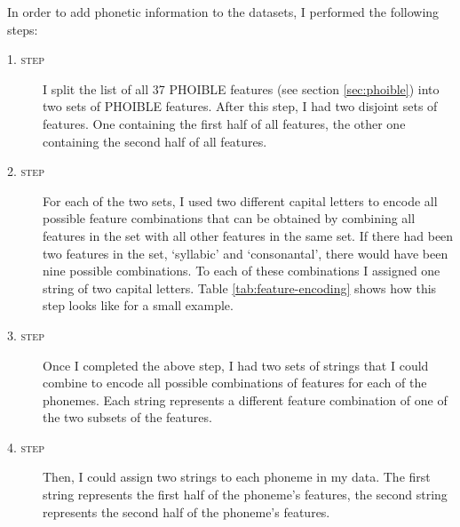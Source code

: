 In order to add phonetic information to the datasets, I performed the following steps:
\begin{description}
    \item[\textsc{1. step}] I split the list of all 37 PHOIBLE features (see section \ref{sec:phoible}) into two sets of PHOIBLE features. After this step, I had two disjoint sets of features. One containing the first half of all features, the other one containing the second half of all features.
    \item[\textsc{2. step}] For each of the two sets, I used two different capital letters to encode all possible feature combinations that can be obtained by combining all features in the set with all other features in the same set. If there had been two features in the set, `syllabic' and `consonantal', there would have been nine possible combinations. To each of these combinations I assigned one string of two capital letters. Table \ref{tab:feature-encoding} shows how this step looks like for a small example. 
    \item[\textsc{3. step}] Once I completed the above step, I had two sets of strings that I could combine to encode all possible combinations of features for each of the phonemes. Each string represents a different feature combination of one of the two subsets of the features.
    \item[\textsc{4. step}] Then, I could assign two strings to each phoneme in my data. The first string represents the first half of the phoneme's features, the second string represents the second half of the phoneme's features.
\end{description}

